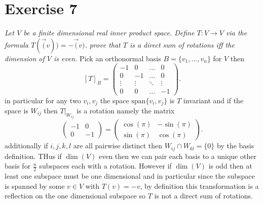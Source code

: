 \documentclass{article}
\begin{document}
    \section{Exercise 7}
    \emph{
        Let $V$ be a finite dimensional real inner product space. Define $T : V \rightarrow V$ via the
        formula $T(\vec(v)) = -\vec(v)$. prove that $T$ is a direct sum of rotations iff the dimension of $V$ is even.
    }
    Pick an orthonormal basis $B = \{v_1,...,v_n\}$ for $V$ then
    \[
        [T]_B = \begin{pmatrix} 
            -1 & 0 & ... & 0\\
            0 & -1 & ... & 0\\
            \vdots & \vdots & \ddots & \vdots\\
            0 & 0 & ... & -1
        \end{pmatrix} 
    .\] 
    in particular for any two $v_i, v_j$ the space $\text{span}\{v_i,v_j\}$ is $T$ invariant and if the space is $W_{ij}$ then
    $T|_{W_{ij}}$ is a rotation namely the matrix 
    \[
        \begin{pmatrix} 
            -1 & 0\\
            0 & -1
        \end{pmatrix} =
        \begin{pmatrix} 
            \cos(\pi) & -\sin(\pi)\\
            \sin(\pi) & \cos(\pi)
        \end{pmatrix} 
    .\] 
    additionally if $i,j,k,l$ are all pairwise distinct then $W_{ij} \cap W_{kl} = \{0\}$ by the basis definition.
    THus if $\dim(V)$ even then we can pair each basis to a unique other basis for  $\frac{n}{2}$ subspaces each with a rotation. However if $\dim(V)$
    is odd then at least one subspace must be one dimensional and in particular since the subspace is spanned by some $v \in V$ with $T(v) = -v$, by definition this transformation
    is a reflection on the one dimensional subspace so $T$ is not a direct sum of rotations.
\end{document}
